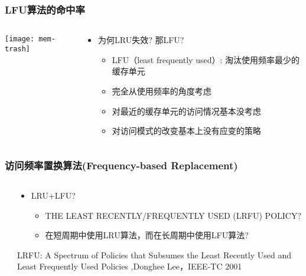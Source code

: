 \begin{frame}[plain]
	\frametitle{LFU算法的命中率}
	\begin{columns}
		\begin{column}{.5\textwidth}
			\centering
			\texttt{[image: mem-trash]}
		\end{column}
		
		\begin{column}{.5\textwidth}
			
			\begin{itemize}
				\item 为何LRU失效? 那LFU?
				\begin{itemize}
					
					\item   LFU（least frequently used）: 淘汰使用频率最少的缓存单元
					
					\item 完全从使用频率的角度考虑
					\item 对最近的缓存单元的访问情况基本没考虑
					\item 对访问模式的改变基本上没有应变的策略

				\end{itemize}
			\end{itemize}
			
			
		\end{column}
		
		
	\end{columns}
\end{frame}

\begin{frame}[plain]
	\frametitle{访问频率置换算法(Frequency-based Replacement)}
	\begin{columns}
		\begin{column}{.1\textwidth}
			\centering
		\end{column}
		
		\begin{column}{1.0\textwidth}
			
			\begin{itemize}
				\item LRU+LFU? 
				
				
				\begin{itemize}
					\item THE LEAST RECENTLY/FREQUENTLY USED (LRFU) POLICY?
					
					\item   在短周期中使用LRU算法，而在长周期中使用LFU算法?
					
					
				\end{itemize}
			\end{itemize}
			
			\tiny LRFU: A Spectrum of Policies that Subsumes the Least Recently Used and Least Frequently Used Policies  ,Donghee Lee，IEEE-TC 2001
		\end{column}
		
		
	\end{columns}
\end{frame}

